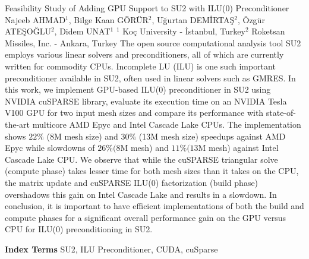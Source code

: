 
    \begin{abstract_online}{Feasibility Study of Adding GPU Support to SU2 with ILU(0) Preconditioner}{%
        Najeeb AHMAD$^{1}$, Bilge Kaan GÖRÜR$^{2}$, Uğurtan DEMİRTAŞ$^{2}$, Özgür ATEŞOĞLU$^{2}$, Didem UNAT$^{1}$}{%
        }{%
        $^1$ Koç University - İstanbul, Turkey\newline{}$^2$ Roketsan Missiles, Inc. - Ankara, Turkey}
    The open source computational analysis tool SU2 employs various linear solvers and preconditioners, all of which are currently written for commodity CPUs. Incomplete LU (ILU) is one such important preconditioner available in SU2, often used in linear solvers such as GMRES. In this work, we implement GPU-based ILU(0) preconditioner in SU2 using NVIDIA cuSPARSE library, evaluate its execution time on an NVIDIA Tesla V100 GPU for two input mesh sizes and compare its performance with state-of-the-art multicore AMD Epyc and Intel Cascade Lake CPUs. The implementation shows $22 \%$ (8M mesh size) and $30 \%$ (13M mesh size) speedups against AMD Epyc while slowdowns of $26 \%(8 \mathrm{M}$ mesh) and $11 \%(13 \mathrm{M}$ mesh) against Intel Cascade Lake CPU. We observe that while the cuSPARSE triangular solve (compute phase) takes lesser time for both mesh sizes than it takes on the CPU, the matrix update and cuSPARSE ILU(0) factorization (build phase) overshadows this gain on Intel Cascade Lake and results in a slowdown. In conclusion, it is important to have efficient implementations of both the build and compute phases for a significant overall performance gain on the GPU versus CPU for ILU(0) preconditioning in SU2. 
    
            \textbf{Index Terms} \newline{}SU2, ILU Preconditioner, CUDA, cuSparse
    \end{abstract_online}
    